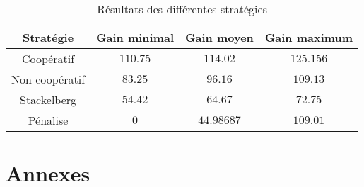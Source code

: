 \documentclass{scrartcl}
\begin{document}
    \begin{table}[h]
      \centering
      \begin{tabular}{|c||c|c|c|}
        \hline
        Stratégie      & Gain minimal & Gain moyen & Gain maximum \\\hline\hline
        Coopératif     & $110.75$     & $114.02$   & $125.156$    \\\hline
        Non coopératif & $83.25$      & $96.16$    & $109.13$     \\\hline
        Stackelberg    & $54.42$      & $64.67$    & $72.75$      \\\hline
        Pénalise       & $0$          & $44.98687$ & $109.01$     \\\hline
      \end{tabular}
      \caption{Résultats des différentes stratégies}
      \label{table:coop_results}
    \end{table}
    
\section{Annexes}
  
  
  
  
\end{document}

